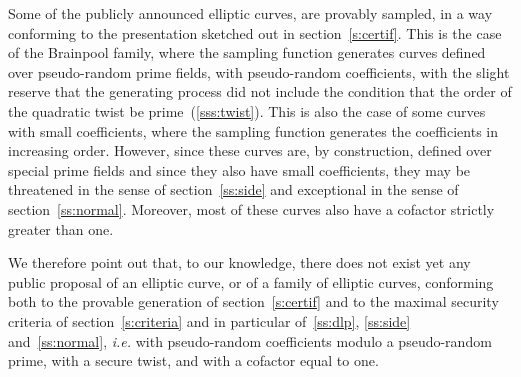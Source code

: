 \documentclass[twocolumn,letterpaper,10pt]{article}
\begin{document}
Some of the publicly announced elliptic curves,
are provably sampled, in a way conforming to the presentation
sketched out in section~\ref{s:certif}.
This is the case of the Brainpool family,
where the sampling function generates
curves defined over pseudo-random prime fields,
with pseudo-random coefficients,
with the slight reserve that the generating process did not include
the condition that the order of the quadratic twist be
prime~(\ref{sss:twist}).
This is also the case of some curves with small coefficients,
where the sampling function generates the coefficients
in increasing order.
However, since these curves are, by construction,
defined over special prime fields
and since they also have small coefficients,
they may be threatened in the sense of section~\ref{ss:side}
and exceptional in the sense of section~\ref{ss:normal}.
Moreover, most of these curves
also have a cofactor strictly greater than one.

\bigbreak

We therefore point out that, to our knowledge,
there does not exist yet any public proposal of an elliptic curve,
or of a family of elliptic curves, conforming both
to the provable generation of section~\ref{s:certif}
and to the maximal security criteria of section~\ref{s:criteria}
and in particular of~\ref{ss:dlp}, \ref{ss:side} and~\ref{ss:normal},
\emph{i.e.} with pseudo-random coefficients
modulo a pseudo-random prime,
with a secure twist,
and with a cofactor equal to one.



\end{document}
